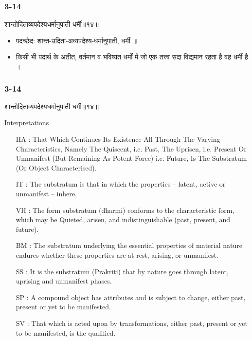 \begin{frame}[fragile]\frametitle{3-14}
\begin{sanskrit}
शान्तोदिताव्यपदेश्यधर्मानुपाती धर्मी॥१४॥
\end{sanskrit}

\begin{itemize}
\item पदच्छेद:  शान्त-उदिता-अव्यपदेश्य-धर्मानुपाती, धर्मी ॥
\item किसी भी पदार्थ के अतीत, वर्तमान व भविष्यत धर्मों में जो एक तत्त्व सदा विद्यमान रहता है वह धर्मी है ।
\end{itemize}
\end{frame}


\begin{frame}[fragile]\frametitle{3-14}
\begin{sanskrit}
शान्तोदिताव्यपदेश्यधर्मानुपाती धर्मी॥१४॥
\end{sanskrit}

Interpretations
\begin{itemize}	
\item [HA]: That Which Continues Its Existence All Through The Varying Characteristics, Namely The Quiscent, i.e. Past, The Uprisen, i.e. Present Or Unmanifest (But Remaining As Potent Force) i.e. Future, Is The Substratum (Or Object Characterised).
\item [IT]: The substratum is that in which the properties – latent, active or unmanifest – inhere.
\item [VH]: The form substratum (dharmi) conforms to the characteristic form, which may be Quieted, arisen, and indistinguishable (past, present, and future).
\item [BM]: The substratum underlying the essential properties of material nature endures whether these properties are at rest, arising, or unmanifest.
\item [SS]: It is the substratum (Prakriti) that by nature goes through latent, uprising and unmanifest phases.
\item [SP]: A compound object has attributes and is subject to change, either past, present or yet to be manifested.
\item [SV]: That which is acted upon by transformations, either past, present or yet to be manifested, is the qualified. 
\end{itemize}
\end{frame}

